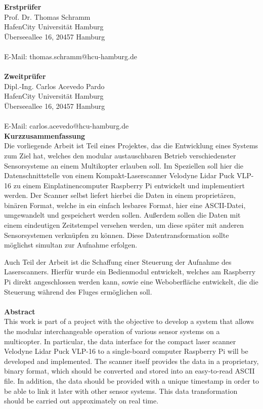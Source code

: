 \documentclass[a4paper,12pt,bibliography=totoc, listof=totoc,titlepage,pointlessnumbers]{scrreprt}
\begin{document}
\noindent\textbf{\large Erstprüfer}\\
Prof. Dr. Thomas Schramm\\
HafenCity Universität Hamburg\\
Überseeallee 16, 20457 Hamburg\\
\\
E-Mail: thomas.schramm@hcu-hamburg.de\\
\vspace{3cm}\\
\textbf{\large Zweitprüfer}\\
Dipl.-Ing. Carlos Acevedo Pardo\\
HafenCity Universität Hamburg\\
Überseeallee 16, 20457 Hamburg\\
\\
E-Mail: carlos.acevedo@hcu-hamburg.de\\
\newpage
\noindent\textbf{\large Kurzzusammenfassung}\\
Die vorliegende Arbeit ist Teil eines Projektes, das die Entwicklung eines Systems zum Ziel hat, welches den modular austauschbaren Betrieb verschiedenster Sensorsysteme an einem Multikopter erlauben soll. Im Speziellen soll hier die Datenschnittstelle von einem Kompakt-Laser\-scan\-ner Velodyne Lidar Puck VLP-16 zu einem Einplatinencomputer Rasp\-berry Pi entwickelt und implementiert werden. Der Scanner selbst liefert hierbei die Daten in einem proprietären, binären Format, welche in ein einfach lesbares Format, hier eine ASCII-Datei, umgewandelt und gespeichert werden sollen. Außerdem sollen die Daten mit einem eindeutigen Zeitstempel versehen werden, um diese später mit anderen Sensorsystemen verknüpfen zu können. Diese Datentransformation sollte möglichst simultan zur Aufnahme erfolgen.

Auch Teil der Arbeit ist die Schaffung einer Steuerung der Aufnahme des Laser\-scan\-ners. Hierfür wurde ein Bedienmodul entwickelt, welches am Rasp\-berry Pi direkt angeschlossen werden kann, sowie eine Weboberfläche entwickelt, die die Steuerung während des Fluges ermöglichen soll.\\
\vspace{2cm}\\
\noindent\textbf{\large Abstract}\\
This work is part of a project with the objective to develop a system that allows the modular interchangeable operation of various sensor systems on a multicopter. In particular, the data interface for the compact laser scanner Velodyne Lidar Puck VLP-16 to a single-board computer Rasp\-berry Pi will be developed and implemented. The scanner itself provides the data in a proprietary, binary format, which should be converted and stored into an easy-to-read ASCII file. In addition, the data should be provided with a unique timestamp in order to be able to link it later with other sensor systems. This data transformation should be carried out approximately on real time.
\end{document}
